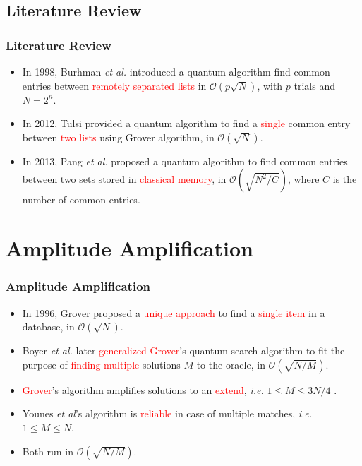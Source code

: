 \documentclass{beamer}
\begin{document}
\subsection*{Literature Review}
\begin{frame}

\frametitle{Literature Review}

\begin{itemize}


\item In 1998, Burhman \textit{et al.} introduced a quantum algorithm \cite{buhrman} find common entries between \textcolor{red}{remotely separated lists} in $\mathcal{O}(p\sqrt{N})$, with $p$ trials and $N=2^n$.

\item In 2012, Tulsi provided a quantum algorithm \cite{tulsi} to find a \textcolor{red}{single} common entry between \textcolor{red}{two lists} using Grover algorithm, in $\mathcal{O}(\sqrt{N})$. 

\item In 2013, Pang \textit{et al.} proposed a quantum algorithm \cite{pang} to find common entries between two sets stored in \textcolor{red}{classical memory}, in $\mathcal{O}(\sqrt{N^2/C})$, where $C$ is the number of common entries.

\end{itemize}
\end{frame}


\section{Amplitude Amplification}
\begin{frame}
\frametitle{Amplitude Amplification}
\begin{itemize}

\item In 1996, Grover proposed a \textcolor{red}{unique approach} \cite{grover} to find a \textcolor{red}{single item} in a database, in $\mathcal{O}(\sqrt{N})$.

\item Boyer \textit{et al.} later \textcolor{red}{generalized Grover}'s quantum search algorithm \cite{quant-tightbound-for-search,grover-younes} to fit the purpose of \textcolor{red}{finding multiple} solutions $M$ to the oracle, in $\mathcal{O}(\sqrt{N/M})$.

\item \textcolor{red}{Grover}'s algorithm amplifies solutions to an \textcolor{red}{extend}, \textit{i.e.} $1\leq M\leq 3N/4$ \cite{quant-tightbound-for-search,grover-younes}.

\item Younes \textit{et al}'s algorithm \cite{younes} is \textcolor{red}{reliable} in case of multiple matches, \textit{i.e.} $1\leq M\leq N$. 

\item Both run in $\mathcal{O}(\sqrt{N/M})$. 


\end{itemize}


\end{frame}
\end{document}
